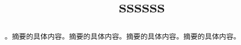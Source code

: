 \documentclass[withoutpreface,bwprint]{cumcmthesis}
\title{ssssss}
\begin{document}
	\maketitle
	\begin{abstract}
		。摘要的具体内容。摘要的具体内容。摘要的具体内容。摘要的具体内容。
	\end{abstract}
	
	\newpage
	
	\newpage
	
\end{document}
